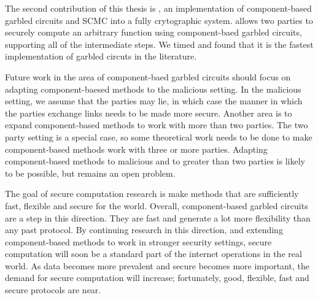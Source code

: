 The second contribution of this thesis is \CompGC, an implementation of component-based garbled circuits and SCMC into a fully crytographic system.
\CompGC allows two parties to securely compute an arbitrary function using component-baed garbled circuits, supporting all of the intermediate steps.
We timed \CompGC and found that it is the fastest implementation of garbled circuts in the literature.

Future work in the area of component-baed garbled circuits should focus on adapting component-baesed methods to the malicious setting.
In the malicious setting, we assume that the parties may lie, in which case the manner in which the parties exchange links needs to be made more secure.
Another area is to expand component-based methods to work with more than two parties.
The two party setting is a special case, so some theoretical work needs to be done to make component-based methods work with three or more parties.
Adapting component-based methods to malicious and to greater than two parties is likely to be possible, but remains an open problem.

The goal of secure computation research is make methods that are sufficiently fast, flexible and secure for the world.
Overall, component-based garbled circuits are a step in this direction.
They are fast and generate a lot more flexibility than any past protocol.
By continuing research in this direction, and extending component-based methods to work in stronger security settings, secure computation will soon be a standard part of the internet operations in the real world.
As data becomes more prevalent and secure becomes more important, the demand for secure computation will increase; fortunately, good, flexible, fast and secure protocols are near.
